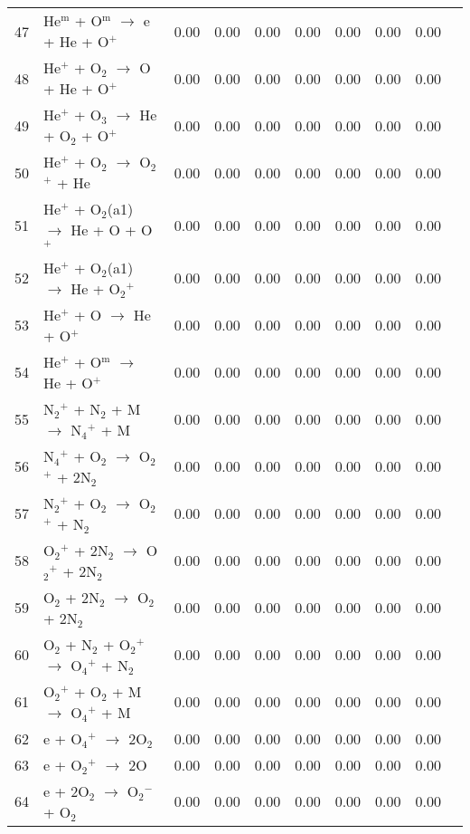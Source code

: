 \documentclass{article}
\begin{document}
\begin{table}[H]
{\begin{tabu}{clcccccccc}
      47 & He$^\text{m}$ + O$^\text{m}$ $\rightarrow$ e + He + O$^{+}$ & 0.00 & 0.00 & 0.00 & 0.00 & 0.00 & 0.00 & 0.00 &  \\
      48 & He$^{+}$ + O$_{2}$ $\rightarrow$ O + He + O$^{+}$ & 0.00 & 0.00 & 0.00 & 0.00 & 0.00 & 0.00 & 0.00 &  \\
      49 & He$^{+}$ + O$_{3}$ $\rightarrow$ He + O$_{2}$ + O$^{+}$ & 0.00 & 0.00 & 0.00 & 0.00 & 0.00 & 0.00 & 0.00 &  \\
      50 & He$^{+}$ + O$_{2}$ $\rightarrow$ O$_{2}$$^{+}$ + He & 0.00 & 0.00 & 0.00 & 0.00 & 0.00 & 0.00 & 0.00 &  \\
      51 & He$^{+}$ + O$_{2}$(a1) $\rightarrow$ He + O + O$^{+}$ & 0.00 & 0.00 & 0.00 & 0.00 & 0.00 & 0.00 & 0.00 &  \\
      52 & He$^{+}$ + O$_{2}$(a1) $\rightarrow$ He + O$_{2}$$^{+}$ & 0.00 & 0.00 & 0.00 & 0.00 & 0.00 & 0.00 & 0.00 &  \\
      53 & He$^{+}$ + O $\rightarrow$ He + O$^{+}$ & 0.00 & 0.00 & 0.00 & 0.00 & 0.00 & 0.00 & 0.00 &  \\
      54 & He$^{+}$ + O$^\text{m}$ $\rightarrow$ He + O$^{+}$ & 0.00 & 0.00 & 0.00 & 0.00 & 0.00 & 0.00 & 0.00 &  \\
      55 & N$_{2}$$^{+}$ + N$_{2}$ + M $\rightarrow$ N$_{4}$$^{+}$ + M & 0.00 & 0.00 & 0.00 & 0.00 & 0.00 & 0.00 & 0.00 &  \\
      56 & N$_{4}$$^{+}$ + O$_{2}$ $\rightarrow$ O$_{2}$$^{+}$ + 2N$_{2}$ & 0.00 & 0.00 & 0.00 & 0.00 & 0.00 & 0.00 & 0.00 &  \\
      57 & N$_{2}$$^{+}$ + O$_{2}$ $\rightarrow$ O$_{2}$$^{+}$ + N$_{2}$ & 0.00 & 0.00 & 0.00 & 0.00 & 0.00 & 0.00 & 0.00 &  \\
      58 & O$_{2}$$^{+}$ + 2N$_{2}$ $\rightarrow$ O$_{2}$$^{+}$ + 2N$_{2}$ & 0.00 & 0.00 & 0.00 & 0.00 & 0.00 & 0.00 & 0.00 &  \\
      59 & O$_{2}$ + 2N$_{2}$ $\rightarrow$ O$_{2}$ + 2N$_{2}$ & 0.00 & 0.00 & 0.00 & 0.00 & 0.00 & 0.00 & 0.00 &  \\
      60 & O$_{2}$ + N$_{2}$ + O$_{2}$$^{+}$ $\rightarrow$ O$_{4}$$^{+}$ + N$_{2}$ & 0.00 & 0.00 & 0.00 & 0.00 & 0.00 & 0.00 & 0.00 &  \\
      61 & O$_{2}$$^{+}$ + O$_{2}$ + M $\rightarrow$ O$_{4}$$^{+}$ + M & 0.00 & 0.00 & 0.00 & 0.00 & 0.00 & 0.00 & 0.00 &  \\
      62 & e + O$_{4}$$^{+}$ $\rightarrow$ 2O$_{2}$ & 0.00 & 0.00 & 0.00 & 0.00 & 0.00 & 0.00 & 0.00 &  \\
      63 & e + O$_{2}$$^{+}$ $\rightarrow$ 2O & 0.00 & 0.00 & 0.00 & 0.00 & 0.00 & 0.00 & 0.00 &  \\
      64 & e + 2O$_{2}$ $\rightarrow$ O$_{2}$$^{-}$ + O$_{2}$ & 0.00 & 0.00 & 0.00 & 0.00 & 0.00 & 0.00 & 0.00 &  \\
    \end{tabu}
  }
\end{table}
\end{document}
